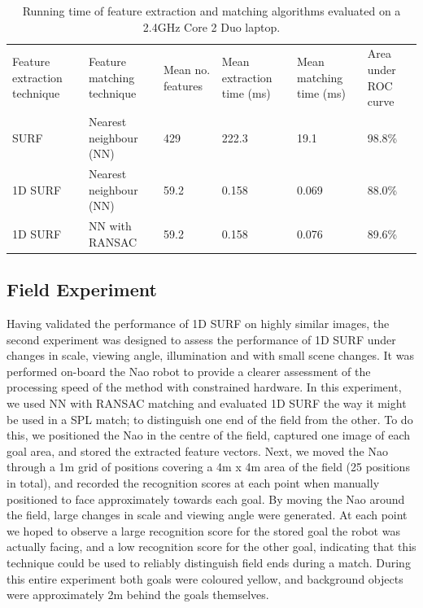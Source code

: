 \documentclass[runningheads,a4paper]{llncs}
\begin{document}
\begin{table}
\caption{Running time of feature extraction and matching algorithms evaluated on a 2.4GHz Core 2 Duo laptop.}
\begin{tabular}{ p{1.8cm}p{4.2cm}p{1.2cm}p{1.5cm}p{1.45cm}p{1.6cm} }
\hline\noalign{\smallskip}
Feature extraction technique & Feature matching technique & Mean no. features & Mean extraction time (ms)  & Mean matching time (ms) & Area under ROC curve\\
\noalign{\smallskip}
\hline
\noalign{\smallskip}
SURF & Nearest neighbour (NN) & 429 & 222.3 & 19.1 & 98.8\% \\
1D SURF & Nearest neighbour (NN) & 59.2 & 0.158 & 0.069 & 88.0\% \\
1D SURF & NN with RANSAC & 59.2 & 0.158 & 0.076 & 89.6\% \\
\hline
\end{tabular}
\label{tab:speed}
\end{table}


\subsection{Field Experiment}
Having validated the performance of 1D SURF on highly similar images, the second experiment was designed to assess the performance of 1D SURF under changes in scale, viewing angle, illumination and with small scene changes. It was performed on-board the Nao robot to provide a clearer assessment of the processing speed of the method with constrained hardware. In this experiment, we used NN with RANSAC matching and evaluated 1D SURF the way it might be used in a SPL match; to distinguish one end of the field from the other. To do this, we positioned the Nao in the centre of the field, captured one image of each goal area, and stored the extracted feature vectors. Next, we moved the Nao through a 1m grid of positions covering a 4m x 4m area of the field (25 positions in total), and recorded the recognition scores at each point when manually positioned to face approximately towards each goal. By moving the Nao around the field, large changes in scale and viewing angle were generated. At each point we hoped to observe a large recognition score for the stored goal the robot was actually facing, and a low recognition score for the other goal, indicating that this technique could be used to reliably distinguish field ends during a match. During this entire experiment both goals were coloured yellow, and background objects were approximately 2m behind the goals themselves.
\end{document}
